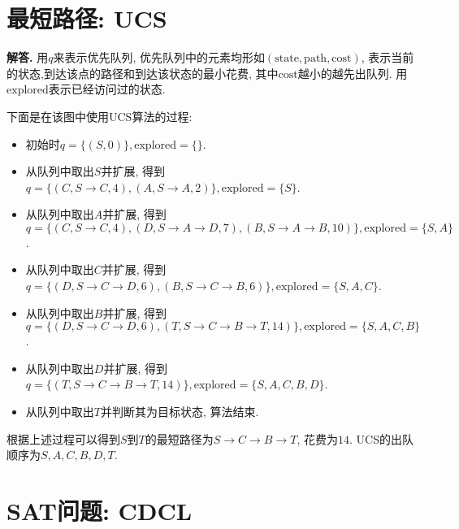 \documentclass[11pt]{article}
\newenvironment{solution}{\par\noindent\textbf{解答. }}{\par}
\newcommand{\ex}{\mathrm{explored}}
\begin{document}
	\section{最短路径: UCS}
	\begin{solution}
		用$q$来表示优先队列, 优先队列中的元素均形如$(\mathrm{state},\mathrm{path}, \mathrm{cost})$, 表示当前的状态,到达该点的路径和到达该状态的最小花费, 其中$\mathrm{cost}$越小的越先出队列. 用$\ex$表示已经访问过的状态.

		下面是在该图中使用UCS算法的过程:
		\begin{itemize}
			\item 初始时$q=\{(S,0)\},\ex=\{\}$.
			\item 从队列中取出$S$并扩展, 得到$q=\{(C,S\to C,4),(A,S\to A,2)\},\ex=\{S\}$.
			\item 从队列中取出$A$并扩展, 得到$q=\{(C,S\to C,4),(D,S\to A\to D, 7),(B,S\to A\to B,10)\},\ex=\{S,A\}$.
			\item 从队列中取出$C$并扩展, 得到$q=\{(D,S\to C\to D,6),(B,S\to C\to B,6)\},\ex=\{S,A,C\}$.
			\item 从队列中取出$B$并扩展, 得到$q=\{(D,S\to C\to D, 6),(T,S\to C\to B\to T,14)\},\ex=\{S,A,C,B\}$.
			\item 从队列中取出$D$并扩展, 得到$q=\{(T,S\to C\to B\to T,14)\},\ex=\{S,A,C,B,D\}$.
			\item 从队列中取出$T$并判断其为目标状态, 算法结束.
		\end{itemize}

		根据上述过程可以得到$S$到$T$的最短路径为$S\to C\to B\to T$, 花费为$14$. UCS的出队顺序为$S,A,C,B,D,T$.
	\end{solution}

	\section{SAT问题: CDCL}
\end{document}
